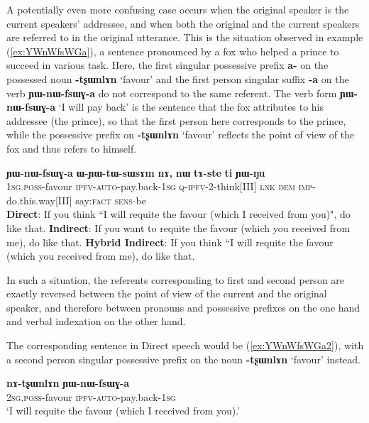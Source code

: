 \documentclass[oneside,a4paper,11pt]{article}
\newcommand{\ipa}[1]{\textbf{\phon#1}} %
\newcommand{\jpg}[2]{\ipa{#1} `#2'} %
\newcommand{\bleu}[1]{{\color{blue}#1}}
\newcommand{\rouge}[1]{{\color{red}#1}}
\newcommand{\refb}[1]{(\ref{#1})}
\begin{document}
A potentially even more confusing case occurs when the original speaker is the current speakers' addressee, and when both the original and the current speakers are referred to in the original utterance. This is the situation observed in example \refb{ex:YWnWfsWGa}, a sentence pronounced by a fox who helped a prince to succeed in various task. Here,  the first singular possessive prefix \ipa{a-} on the possessed noun \jpg{-tʂɯnlɤn}{favour} and the first person singular suffix \ipa{-a} on the verb \ipa{ɲɯ-nɯ-fsɯɣ-a} do not correspond to the same referent. The verb form \ipa{ɲɯ-nɯ-fsɯɣ-a} `I will pay back' is the sentence that the fox attributes to his addressee (the prince), so that the first person here corresponds to the prince, while the possessive prefix on \jpg{-tʂɯnlɤn}{favour} reflects the point of view of the fox and thus refers to himself.

 \begin{exe}
 \ex \label{ex:YWnWfsWGa}
 \gll   \rouge{\ipa{a-tʂɯnlɤn}}  	\bleu{\ipa{ɲɯ-nɯ-fsɯɣ-a}}  	\ipa{ɯ-ɲɯ-tɯ-sɯsɤm}  	\ipa{nɤ,}  	\ipa{nɯ}  	\ipa{tɤ-ste}  	\ipa{ti}  \ipa{ɲɯ-ŋu} \\
  {\textsc{1sg.poss}-favour} {\textsc{ipfv-auto}-pay.back-\textsc{1sg}} \textsc{q-ipfv}-2-think[III] \textsc{lnk} \textsc{dem} \textsc{imp}-do.this.way[III] say:\textsc{fact} \textsc{sens}-be \\
  \glt    \textbf{Direct}: If you think ``\bleu{I will requite the favour (which I received from you)}", do like that.
 \glt    \textbf{Indirect}: If you want to \rouge{requite the favour (which you received from me}), do like that.
 \glt   \textbf{Hybrid Indirect}: If you think ``\bleu{I} will requite the \rouge{favour (which you received from me}), do like that.
   \end{exe}
In such a situation, the referents corresponding to first and second person are exactly reversed between the point of view of the current and the original speaker, and therefore between pronouns and possessive prefixes on the one hand and verbal indexation on the other hand.
   
The corresponding sentence in Direct speech would be \refb{ex:YWnWfsWGa2}, with a second person singular possessive prefix on the noun  \jpg{-tʂɯnlɤn}{favour} instead.

\begin{exe}
\ex \label{ex:YWnWfsWGa2}
 \gll  \ipa{nɤ-tʂɯnlɤn}  	\ipa{ɲɯ-nɯ-fsɯɣ-a} \\
  {\textsc{2sg.poss}-favour} {\textsc{ipfv-auto}-pay.back-\textsc{1sg}} \\ 
 \glt `I will requite the favour (which I received from you).'
\end{exe}
\end{document}
